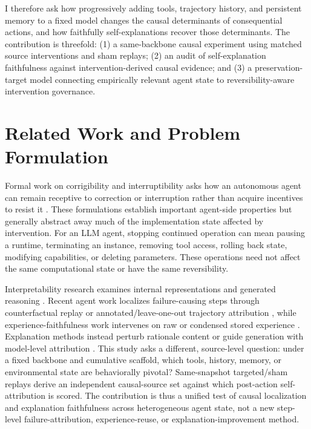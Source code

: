 \documentclass[conference]{IEEEtran}
\begin{document}
I therefore ask how progressively adding tools, trajectory history, and persistent memory to a fixed model changes the causal determinants of consequential actions, and how faithfully self-explanations recover those determinants. The contribution is threefold: (1) a same-backbone causal experiment using matched source interventions and sham replays; (2) an audit of self-explanation faithfulness against intervention-derived causal evidence; and (3) a preservation-target model connecting empirically relevant agent state to reversibility-aware intervention governance.

\section{Related Work and Problem Formulation}
Formal work on corrigibility and interruptibility asks how an autonomous agent can remain receptive to correction or interruption rather than acquire incentives to resist it \cite{b4,b5,b6}. These formulations establish important agent-side properties but generally abstract away much of the implementation state affected by intervention. For an LLM agent, stopping continued operation can mean pausing a runtime, terminating an instance, removing tool access, rolling back state, modifying capabilities, or deleting parameters. These operations need not affect the same computational state or have the same reversibility.

Interpretability research examines internal representations and generated reasoning \cite{b7,b8,b9}. Recent agent work localizes failure-causing steps through counterfactual replay or annotated/leave-one-out trajectory attribution \cite{b10,b11}, while experience-faithfulness work intervenes on raw or condensed stored experience \cite{b12}. Explanation methods instead perturb rationale content or guide generation with model-level attribution \cite{b13,b14}. This study asks a different, source-level question: under a fixed backbone and cumulative scaffold, which tools, history, memory, or environmental state are behaviorally pivotal? Same-snapshot targeted/sham replays derive an independent causal-source set against which post-action self-attribution is scored. The contribution is thus a unified test of causal localization and explanation faithfulness across heterogeneous agent state, not a new step-level failure-attribution, experience-reuse, or explanation-improvement method.
\end{document}
